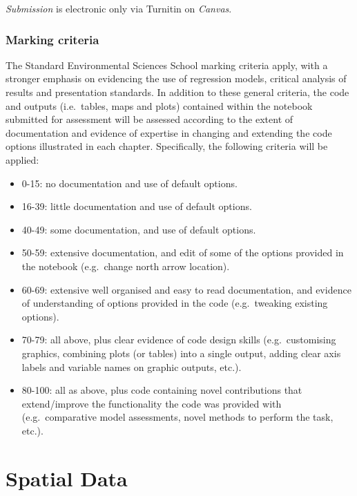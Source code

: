 \documentclass[
]{book}
\providecommand{\tightlist}{%
  \setlength{\itemsep}{0pt}\setlength{\parskip}{0pt}}
\begin{document}
\emph{Submission} is electronic only via Turnitin on \emph{Canvas}.

\hypertarget{marking-criteria}{%
\subsection{Marking criteria}\label{marking-criteria}}

The Standard Environmental Sciences School marking criteria apply, with a stronger emphasis on evidencing the use of regression models, critical analysis of results and presentation standards. In addition to these general criteria, the code and outputs (i.e.~tables, maps and plots) contained within the notebook submitted for assessment will be assessed according to the extent of documentation and evidence of expertise in changing and extending the code options illustrated in each chapter. Specifically, the following criteria will be applied:

\begin{itemize}
\tightlist
\item
  0-15: no documentation and use of default options.
\item
  16-39: little documentation and use of default options.
\item
  40-49: some documentation, and use of default options.
\item
  50-59: extensive documentation, and edit of some of the options provided in the notebook (e.g.~change north arrow location).
\item
  60-69: extensive well organised and easy to read documentation, and evidence of understanding of options provided in the code (e.g.~tweaking existing options).
\item
  70-79: all above, plus clear evidence of code design skills (e.g.~customising graphics, combining plots (or tables) into a single output, adding clear axis labels and variable names on graphic outputs, etc.).
\item
  80-100: all as above, plus code containing novel contributions that extend/improve the functionality the code was provided with (e.g.~comparative model assessments, novel methods to perform the task, etc.).
\end{itemize}

\hypertarget{spatial_data}{%
\chapter{Spatial Data}\label{spatial_data}}
\end{document}
